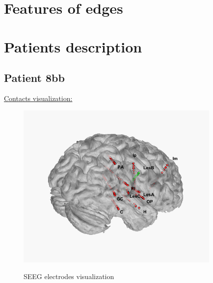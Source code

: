 \documentclass[11pt,oneside]{amsart}
\begin{document}
 
 
 \section{Features of edges}

\section{Patients description}
\subsection{Patient 8bb}\hfill

\underline{Contacts visualization:} 
  
\begin{figure}[H] \hspace{-0cm} \centering \hspace{0cm} \includegraphics[width=10cm,angle=0]{figures/all_electrodes.png} \label{fig:7}
        \caption{SEEG electrodes visualization} 
      \end{figure}
      
\end{document}
